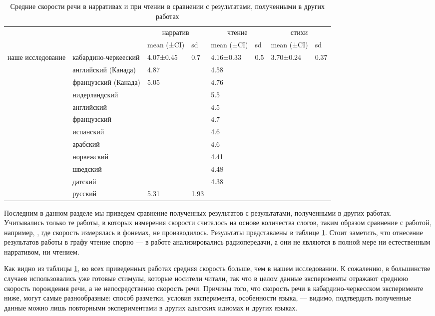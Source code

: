 \begin{table}[t]
\begin{tabular}{|l|l|l|l|l|l|l|l|}
\hline
\multicolumn{2}{|c|}{} & \multicolumn{2}{c|}{нарратив}  & \multicolumn{2}{c|}{чтение} & \multicolumn{2}{c|}{стихи} \\ \cline{3-8}
\multicolumn{2}{|c|}{} & \multicolumn{ 1}{c|}{mean (±CI)} & sd & \multicolumn{1}{c|}{mean (±CI)}& sd & \multicolumn{ 1}{c|}{mean (±CI)}& sd \\ \hline
наше исследование & кабардино-черкееский & 4.07±0.45 & 0.7 & 4.16±0.33 & 0.5 & 3.70±0.24 & 0.37 \\ \hline
\cite[120]{barik77} &английский (Канада) & 4.87 &  & 4.58 &  &  &  \\ \hline
\cite[120]{barik77} &французский (Канада) & 5.05 &  & 4.76 &  &  &  \\ \hline
\cite[140]{vaane82} &нидерландский &  &  & 5.5 &  &  &  \\ \hline
\cite[140]{vaane82} &английский &  &  & 4.5 &  &  &  \\ \hline
\cite[140]{vaane82} &французский &  &  & 4.7 &  &  &  \\ \hline
\cite[140]{vaane82} &испанский &  &  & 4.6 &  &  &  \\ \hline
\cite[140]{vaane82} &арабский &  &  & 4.6 &  &  &  \\ \hline
\cite[226]{hilton11} &норвежский &  &  & 4.41 &  &  &  \\ \hline
\cite[226]{hilton11} &шведский &  &  & 4.48 &  &  &  \\ \hline
\cite[226]{hilton11} &датский &  &  & 4.38 &  &  &  \\ \hline
\cite[226]{stepanova11} &русский&  5.31 & 1.93 & &  &  &  \\ \hline
\end{tabular}
\caption{Средние скорости речи в нарративах и при чтении в сравнении с результатами, полученными в других работах}
\label{workscomparieson}
\end{table}
\par Последним в данном разделе мы приведем сравнение полученных результатов с результатами, полученными в других работах. Учитывались только те работы, в которых измерения скорости считалось на основе количества слогов, таким образом сравнение с работой, например, \citep{osser64}, где скорость измерялась в фонемах, не производилось. Результаты представлены в таблице \ref{workscomparieson}. Стоит заметить, что отнесение результатов работы \citep{hilton11} в графу чтение спорно --- в работе анализировались радиопередачи, а они не являются в полной мере ни естественным нарративом, ни чтением.
\par Как видно из таблицы \ref{workscomparieson}, во всех приведенных работах средняя скорость больше, чем в нашем исследовании. К сожалению, в большинстве случаев использовались уже готовые стимулы, которые носители читали, так что в целом данные эксперименты отражают среднюю скорость порождения речи, а не непосредственно скорость речи. Причины того, что скорость речи в кабардино-черкесском эксперименте ниже, могут самые разнообразные: способ разметки, условия эксперимента, особенности языка, --- видимо, подтвердить полученные данные можно лишь повторными экспериментами в других адыгских идиомах и других языках.
